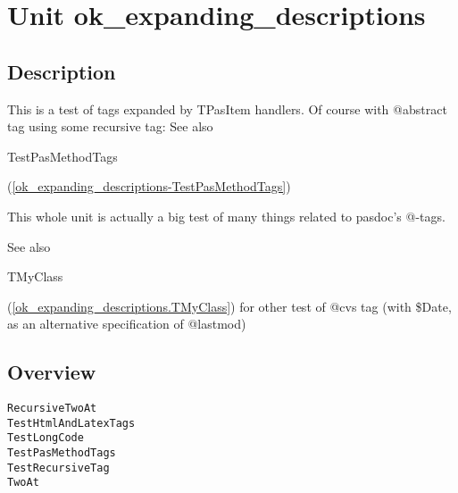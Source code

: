 \documentclass{report}
\begin{document}
\chapter{Unit ok{\_}expanding{\_}descriptions}
\section{Description}
This is a test of tags expanded by TPasItem handlers. Of course with @abstract tag using some recursive tag: See also \begin{ttfamily}TestPasMethodTags\end{ttfamily}(\ref{ok_expanding_descriptions-TestPasMethodTags})\hfill\vspace*{1ex}



This whole unit is actually a big test of many things related to pasdoc's @{-}tags.

   

See also \begin{ttfamily}TMyClass\end{ttfamily}(\ref{ok_expanding_descriptions.TMyClass}) for other test of @cvs tag (with {\$}Date, as an alternative specification of @lastmod)
\section{Overview}
\begin{description}
\item[\texttt{\begin{ttfamily}EFoo\end{ttfamily} Class}]
\item[\texttt{\begin{ttfamily}EBar\end{ttfamily} Class}]
\item[\texttt{\begin{ttfamily}EXyz\end{ttfamily} Class}]
\item[\texttt{\begin{ttfamily}TMyClassAncestor\end{ttfamily} Class}]
\item[\texttt{\begin{ttfamily}TMyClass\end{ttfamily} Class}]
\end{description}
\begin{description}
\item[\texttt{RecursiveTwoAt}]
\item[\texttt{TestHtmlAndLatexTags}]
\item[\texttt{TestLongCode}]
\item[\texttt{TestPasMethodTags}]
\item[\texttt{TestRecursiveTag}]
\item[\texttt{TwoAt}]
\end{description}
\end{document}
